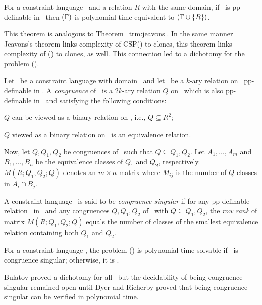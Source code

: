\begin{theorem} 
For a constraint language \mrelset\ and a relation \(R\) with the same domain,
if \mR\ is pp-definable in \mrelset\ then \ccsp\((\Gamma)\) is polynomial-time equivalent 
to \ccsp\((\Gamma \cup \{{R}\})\)\@.
\end{theorem}

This theorem is analogous to Theorem~\ref{trm:jeavons}. In the same manner Jeavons's theorem
links complexity of CSP(\mrelset) to clones, this theorem
links complexity of \ccsp(\mrelset) to clones, as well. This connection
led to a dichotomy for the problem \ccsp(\mrelset)\@.

Let \mrelset\ be a constraint language with domain \mD\ and 
let \mR\ be a \(k\)-ary relation on \mD\ pp-definable in \mrelset\@.
A \emph{congruence} of \mR\ is a \(2k\)-ary relation \(Q\) on \mD\ 
which is also pp-definable in \mrelset\
and satisfying the following conditions:
\begin{inparaenum}[(a)]
\item \(Q\) can be viewed as a binary relation on \mR, i.e., \(Q \subseteq R^2\);
\item \(Q\) viewed as a binary relation on \mR\ is an equivalence relation.
\end{inparaenum}


Now, let \(Q,Q_1,Q_2\) be congruences of \mR\ such that
\(Q\subseteq Q_1,Q_2\). Let \(A_1,\dotsc,A_m\) and \(B_1,\dotsc,B_n\) be
the equivalence classes of \(Q_1\) and \(Q_2\), respectively. 
\(M(R;Q_1,Q_2;Q)\) denotes an \(m\times n\) matrix where \(M_{ij}\) is the number of \(Q\)-classes in
\(A_i\cap B_j\). 

A constraint language \mrelset\ is said to be \emph{congruence
 singular} if for any pp-definable relation \mR\ in \mrelset\ and any congruences
\(Q,Q_1,Q_2\) of \mR\ with \(Q\subseteq Q_1,Q_2\), the
\emph{row rank} of  matrix \(M(R;Q_1,Q_2;Q)\) equals
the number of classes of the smallest equivalence relation containing
both \(Q_1\) and \(Q_2\)\@. 

\begin{theorem}
For a constraint language \mrelset,
the problem \ccsp(\mrelset) is polynomial time solvable if 
\mrelset\ is congruence singular; otherwise, it is \cpc\@.
\end{theorem}

Bulatov proved a dichotomy for all \mrelset\ but the decidability of being congruence
singular remained open until Dyer  and Richerby \cite{DyerR10} 
proved that being congruence singular can be verified in polynomial time.

